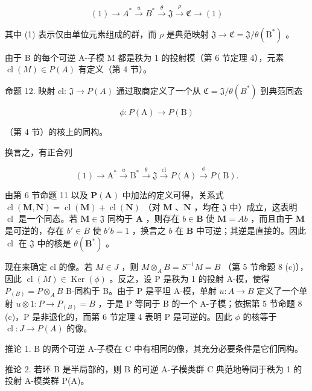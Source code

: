 \[
(1) \longrightarrow A ^ {*} \stackrel {u} {\longrightarrow} B ^ {*} \stackrel {\theta} {\longrightarrow} \mathfrak {J} \stackrel {\rho} {\longrightarrow} \mathfrak {C} \longrightarrow (1)\tag{10}
\]

其中 (1) 表示仅由单位元素组成的群，而 \(\rho\) 是典范映射 \(\mathfrak{J} \to \mathfrak{C} = \mathfrak{J}/\theta(\mathrm{B}^*)\) 。

由于 B 的每个可逆 A-子模 M 都是秩为 1 的投射模（第 6 节定理 4），元素 \(\operatorname{cl}(M) \in P(A)\) 有定义（第 4 节）。

命题 12. 映射 cl: \(\mathfrak{J} \to P(A)\) 通过取商定义了一个从 \(\mathfrak{C} = \mathfrak{J}/\theta(B^{*})\) 到典范同态

\[
\phi \colon P (\mathrm{A}) \to P (\mathrm{B})
\]

（第 4 节）的核上的同构。

换言之，有正合列

\[
(1) \longrightarrow \mathrm{A} ^ {*} \stackrel {u} {\longrightarrow} \mathrm{B} ^ {*} \stackrel {\theta} {\longrightarrow} \mathfrak {J} \stackrel {\mathrm{cl}} {\longrightarrow} P (\mathrm{A}) \stackrel {\phi} {\longrightarrow} P (\mathrm{B}).\tag{11}
\]

由第 6 节命题 11 以及 \(\mathbf{P}(\mathbf{A})\) 中加法的定义可得，关系式 \(\operatorname{cl}(\mathbf{M},\mathbf{N}) = \operatorname{cl}(\mathbf{M}) + \operatorname{cl}(\mathbf{N})\) （对 \(\mathbf{M}\) 、\(\mathbf{N}\) ，均在 \(\mathfrak{J}\) 中）成立，这表明 \(\operatorname{cl}\) 是一个同态。若 \(\mathbf{M} \in \mathfrak{J}\) 同构于 \(\mathbf{A}\) ，则存在 \(b \in \mathbf{B}\) 使 \(\mathbf{M} = Ab\) ，而且由于 \(\mathbf{M}\) 是可逆的，存在 \(b' \in B\) 使 \(b'b = 1\) ，换言之 \(b\) 在 \(\mathbf{B}\) 中可逆；其逆是直接的。因此 \(\operatorname{cl}\) 在 \(\mathfrak{J}\) 中的核是 \(\theta(\mathbf{B}^*)\) 。

现在来确定 cl 的像。若 \(M \in J\) ，则 \(M \otimes_{A} B = S^{-1}M = B\) （第 5 节命题 8 (c)），因此 \(\operatorname{cl}(M) \in \operatorname{Ker}(\phi)\) 。反之，设 P 是秩为 1 的投射 A-模，使得 \(P_{(B)} = P \otimes_{A} B\) B-同构于 B。由于 P 是平坦 A-模，单射 \(u: A \to B\) 定义了一个单射 \(u \otimes 1: P \to P_{(B)} = B\) ，于是 P 等同于 B 的一个 A-子模；依据第 5 节命题 8 (c)，P 是非退化的，而第 6 节定理 4 表明 P 是可逆的。因此 \(\phi\) 的核等于 \(\operatorname{cl}: J \to P(A)\) 的像。

推论 1. B 的两个可逆 A-子模在 C 中有相同的像，其充分必要条件是它们同构。

推论 2. 若环 B 是半局部的，则 B 的可逆 A-子模类群 C 典范地等同于秩为 1 的投射 A-模类群 P(A)。

